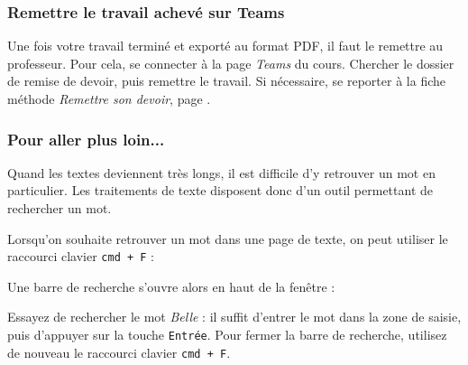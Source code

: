 \subsubsection{Remettre le travail achevé sur Teams}

Une fois votre travail terminé et exporté au format PDF, il faut le remettre au professeur. Pour cela, se connecter à la page \emph{Teams} du cours. Chercher le dossier de remise de devoir, puis remettre le travail. Si nécessaire, se reporter à la fiche méthode \emph{Remettre son devoir}, page \pageref{TeamsRemettreDevoir}.  





\subsubsection{Pour aller plus loin...}  

Quand les textes deviennent très longs, il est difficile d'y retrouver un mot en particulier. Les traitements de texte disposent donc d'un outil permettant de rechercher un mot. 

Lorsqu'on souhaite retrouver un mot dans une page de texte, on peut utiliser le raccourci clavier \texttt{cmd + F} :   


Une barre de recherche s'ouvre alors en haut de la fenêtre :


Essayez de rechercher le mot \emph{Belle} : il suffit d'entrer le mot dans la zone de saisie, puis d'appuyer sur la touche \texttt{Entrée}. Pour fermer la barre de recherche, utilisez de nouveau le raccourci clavier \texttt{cmd + F}.   


%
%


